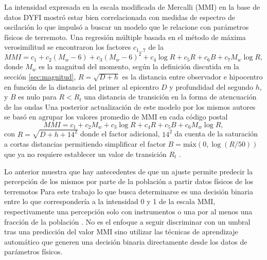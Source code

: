 \documentclass[a4paper]{report}
\begin{document}
La intensidad expresada en la escala modificada de Mercalli (MMI) \cite{noauthor_intensidad_2022} en la base de datos DYFI mostró estar bien correlacionada con medidas de espectro de oscilación lo que impulsó a buscar un modelo que le relacione con parámetros físicos de terremoto.
Una regresión múltiple basada en el método de máxima verosimilitud se encontraron los factores \(c_{1\dots7}\) de la \cite[ecuación 1]{atkinson_did_2007}
\begin{equation}
	MMI = c_1 + c_2 (M_w - 6) + c_3 (M_w - 6)^2 + c_4\log{R} + c_5 R + c_6 B + c_7 M_w \log{R}, 
	\label{eq:atkinson2007}
\end{equation}
donde \(M_w\) es la magnitud del momento, según la definición discutida en la sección \ref{sec:magnitud}, \(R = \sqrt{D + h}\) es la distancia entre observador e hipocentro en función de la distancia del primer al epicentro \(D\) y profundidad del segundo \(h\), y \(B\) es nulo para \(R < R_t\) una distancia de transición en la forma de atencuación de las ondas 
Una posterior actualización de este modelo por los mismos autores se basó en agrupar los valores promedio de MMI en cada código postal
\begin{equation}
	MMI = c_1 + c_2 M_w + c_3 \log{R} + c_4 R + c_5 B + c_6 M_w\log{R},
	\label{eq:atkinson2014}
\end{equation}
con \(R = \sqrt{D + h + 14^2 }\) donde el factor adicional, \(14^2\) da cuenta de la saturación a cortas distancias permitiendo simplificar el factor \(B = \text{máx}(0, \log(R/50))\) que ya no requiere establecer un valor de transición \(R_t\) \cite{atkinson_intensity_2014}. 
	
Lo anterior muestra que hay antecedentes de que un ajuste permite predecir la percepción de los mismos por parte de la población a partir datos físicos de los terremotos 
Para este trabajo lo que busca determinarse es una decisión binaria entre lo que correspondería a la intensidad 0 y 1 de la escala MMI, respectivamente una percepción solo con instrumentos o una por al menos una fracción de la población \cite{noauthor_intensidad_2022}.
No es el enfoque a seguir discriminar con un umbral tras una predicción del valor MMI sino utilizar las técnicas de aprendizaje automático que generen una decisión binaria directamente desde los datos de parámetros físicos.

\end{document}
